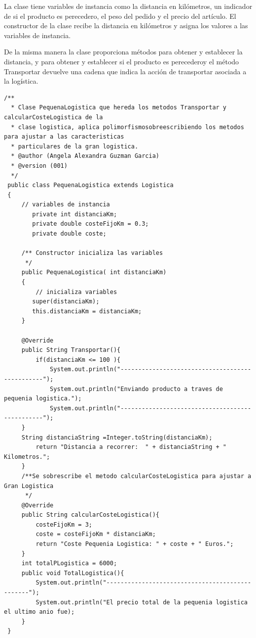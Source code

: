 \documentclass[10pt,a4paper]{article}
\def\StartLineAt#1{\lstset{firstnumber=#1}}
\begin{document}
La clase tiene variables de instancia como la distancia en kilómetros, un indicador de si el producto es perecedero, el peso del pedido y el precio del artículo. El constructor de la clase recibe la distancia en kilómetros y asigna los valores a las variables de instancia.

De la misma manera la clase proporciona métodos para obtener y establecer la distancia, y para obtener y establecer si el producto es perecederoy el método Transportar devuelve una cadena que indica la acción de transportar asociada a la logística.


\StartLineAt{1}
\begin{lstlisting}[style=Java]
  /**
  * Clase PequenaLogistica que hereda los metodos Transportar y calcularCosteLogistica de la 
  * clase logistica, aplica polimorfismosobreescribiendo los metodos para ajustar a las caracteristicas 
  * particulares de la gran logistica.
  * @author (Angela Alexandra Guzman Garcia) 
  * @version (001)
  */
 public class PequenaLogistica extends Logistica
 {
     // variables de instancia
        private int distanciaKm;
        private double costeFijoKm = 0.3; 
        private double coste;
    
     /** Constructor inicializa las variables
      */
     public PequenaLogistica( int distanciaKm)
     {
         // inicializa variables
        super(distanciaKm);
        this.distanciaKm = distanciaKm;
     }
     
     @Override
     public String Transportar(){
         if(distanciaKm <= 100 ){
             System.out.println("------------------------------------------------");
             System.out.println("Enviando producto a traves de pequenia logistica.");
             System.out.println("------------------------------------------------");
     }
     String distanciaString =Integer.toString(distanciaKm); 
         return "Distancia a recorrer:  " + distanciaString + " Kilometros.";
     }
     /**Se sobrescribe el metodo calcularCosteLogistica para ajustar a Gran Logistica
      */
     @Override
     public String calcularCosteLogistica(){
         costeFijoKm = 3;
         coste = costeFijoKm * distanciaKm; 
         return "Coste Pequenia Logistica: " + coste + " Euros.";
     }
     int totalPLogistica = 6000;
     public void TotalLogistica(){
         System.out.println("------------------------------------------------");
         System.out.println("El precio total de la pequenia logistica el ultimo anio fue);
     }
 }
 
\end{lstlisting}
\end{document}
